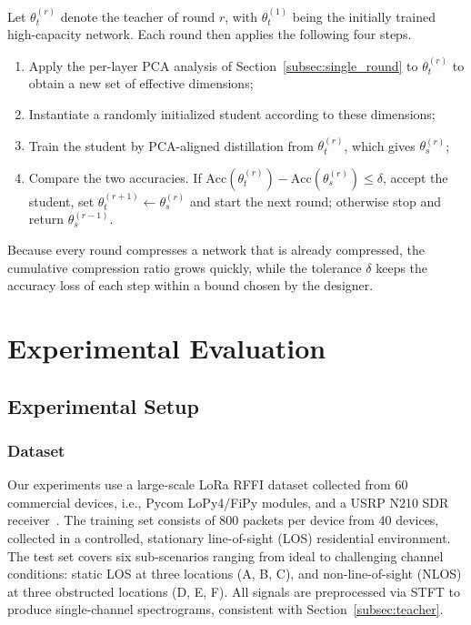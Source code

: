 \documentclass[journal,comsoc]{IEEEtran}
\begin{document}
Let $\theta_t^{(r)}$ denote the teacher of round $r$, with $\theta_t^{(1)}$ being the initially trained high-capacity network. Each round then applies the following four steps.
\begin{enumerate}
    \item Apply the per-layer PCA analysis of Section~\ref{subsec:single_round} to $\theta_t^{(r)}$ to obtain a new set of effective dimensions;
    \item Instantiate a randomly initialized student according to these dimensions;
    \item Train the student by PCA-aligned distillation from $\theta_t^{(r)}$, which gives $\theta_s^{(r)}$;
    \item Compare the two accuracies. If $\text{Acc}(\theta_t^{(r)}) - \text{Acc}(\theta_s^{(r)}) \le \delta$, accept the student, set $\theta_t^{(r+1)} \leftarrow \theta_s^{(r)}$ and start the next round; otherwise stop and return $\theta_s^{(r-1)}$.
\end{enumerate}
Because every round compresses a network that is already compressed, the cumulative compression ratio grows quickly, while the tolerance $\delta$ keeps the accuracy loss of each step within a bound chosen by the designer.


\section{Experimental Evaluation}
\label{sec:experimental_evaluation}


\subsection{Experimental Setup}
\label{subsec:experimental_setup}

\subsubsection{Dataset}
\label{subsubsec:dataset_description}

Our experiments use a large-scale LoRa RFFI dataset collected from 60 commercial devices, i.e., Pycom LoPy4/FiPy modules, and a USRP N210 SDR receiver~\cite{9715147}.
The training set consists of 800 packets per device from 40 devices, collected in a controlled, stationary line-of-sight (LOS) residential environment.
The test set covers six sub-scenarios ranging from ideal to challenging channel conditions: static LOS at three locations (A, B, C), and non-line-of-sight (NLOS) at three obstructed locations (D, E, F).
All signals are preprocessed via STFT to produce single-channel spectrograms, consistent with Section~\ref{subsec:teacher}.
\end{document}
